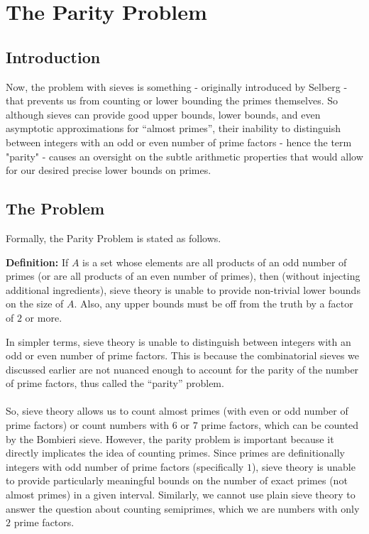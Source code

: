 \documentclass[10pt]{extarticle}
\begin{document}
\pagebreak
\section{The Parity Problem}  
\subsection{Introduction}
Now, the problem with sieves is something - originally introduced by Selberg - that prevents us from counting or lower bounding the primes themselves. So although sieves can provide good upper bounds, lower bounds, and even asymptotic approximations for ``almost primes'', their inability to distinguish between integers with an odd or even number of prime factors - hence the term "parity" - causes an oversight on the subtle arithmetic properties that would allow for our desired precise lower bounds on primes.
\subsection{The Problem}
Formally, the Parity Problem is stated as follows.
\begin{boxedsection}
\textbf{Definition:} If $A$ is a set whose elements are all products of an odd number of primes (or are all products of an even number of primes), then (without injecting additional ingredients), sieve theory is unable to provide non-trivial lower bounds on the size of $A$. Also, any upper bounds must be off from the truth by a factor of $2$ or more.
\end{boxedsection}
In simpler terms, sieve theory is unable to distinguish between integers with an odd or even number of prime factors. This is because the combinatorial sieves we discussed earlier are not nuanced enough to account for the parity of the number of prime factors, thus called the ``parity'' problem. \\
\\
So, sieve theory allows us to count almost primes (with even or odd number of prime factors) or count numbers with $6$ or $7$ prime factors, which can be counted by the Bombieri sieve. 
However, the parity problem is important because it directly implicates the idea of counting primes. Since primes are definitionally integers with odd number of prime factors (specifically $1$), sieve theory is unable to provide particularly meaningful bounds on the number of exact primes (not almost primes) in a given interval. 
Similarly, we cannot use plain sieve theory to answer the question about counting semiprimes, which we are numbers with only $2$ prime factors. 
\end{document}
